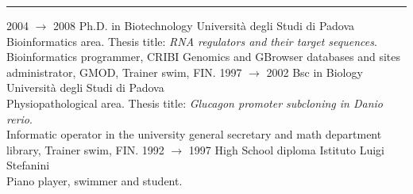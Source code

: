 \documentclass[8pt]{stackoverflow-upgraded-version} %
\begin{document}
\newpage

\textcolor{stackoverflow}{\hrule}
\vspace{\baselineskip} %
\begin{entrylist}
	\entry
		{2004 $\rightarrow$ 2008}
		{Ph.D. in Biotechnology}
		{Università degli Studi di Padova}
		{\\
		Bioinformatics area. Thesis title: \emph{RNA regulators and their target sequences}.\\
		Bioinformatics programmer, CRIBI Genomics and GBrowser databases and sites administrator, GMOD, Trainer swim, FIN.}
	\entry
		{1997 $\rightarrow$ 2002}
		{Bsc in Biology}
		{Università degli Studi di Padova}
		{\\
		Physiopathological area. Thesis title: \emph{Glucagon promoter subcloning in Danio rerio}.\\
		Informatic operator in the university general secretary and math department library, Trainer swim, FIN.}
	\entry
		{1992 $\rightarrow$ 1997}
		{High School diploma}
		{Istituto Luigi Stefanini}
		{\\
		Piano player, swimmer and student.}
\end{entrylist}
\end{document}
